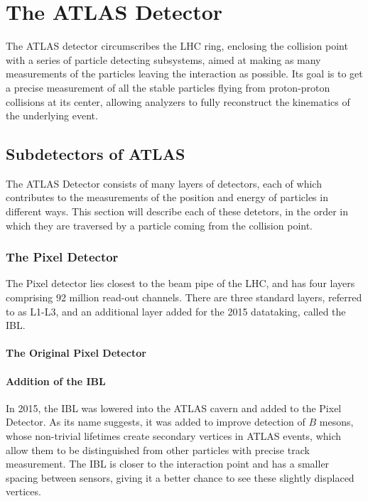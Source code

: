 
\chapter{The ATLAS Detector} %

\label{ch:atlas} %

The ATLAS detector circumscribes the LHC ring, enclosing the collision point with a series of particle detecting subsystems, aimed at making as many measurements of the particles leaving the interaction as possible. Its goal is to get a precise measurement of all the stable particles flying from proton-proton collisions at its center, allowing analyzers to fully reconstruct the kinematics of the underlying event.


\section{Subdetectors of ATLAS}

The ATLAS Detector consists of many layers of detectors, each of which contributes to the measurements of the position and energy of particles in different ways. This section will describe each of these detetors, in the order in which they are traversed by a particle coming from the collision point. 


\subsection{The Pixel Detector}

The Pixel detector lies closest to the beam pipe of the \ac{LHC}, and has four layers comprising 92 million read-out channels. There are three standard layers, referred to as L1-L3, and an additional layer added for the 2015 datataking, called the \ac{IBL}. 

\subsubsection{The Original Pixel Detector}



\subsubsection{Addition of the IBL}

In 2015, the \ac{IBL} was lowered into the ATLAS cavern and added to the Pixel Detector. As its name suggests, it was added to improve detection of $B$ mesons, whose non-trivial lifetimes create secondary vertices in ATLAS events, which allow them to be distinguished from other particles with precise track measurement. The \ac{IBL} is closer to the interaction point and has a smaller spacing between sensors, giving it a better chance to see these slightly displaced vertices.

